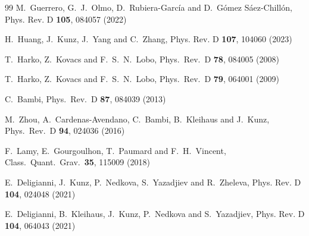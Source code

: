 \documentclass[11pt,a4paper]{article}
\begin{document}
\begin{thebibliography}{99}
M.~Guerrero, G.~J.~Olmo, D.~Rubiera-Garc\'ia and D.~G\'omez S\'aez-Chill\'on,
Phys. Rev. D \textbf{105}, 084057 (2022)


H.~Huang, J.~Kunz, J.~Yang and C.~Zhang,
Phys. Rev. D \textbf{107}, 104060 (2023)

  T.~Harko, Z.~Kovacs and F.~S.~N.~Lobo,
  Phys.\ Rev.\ D {\bf 78}, 084005 (2008)

  T.~Harko, Z.~Kovacs and F.~S.~N.~Lobo,
  Phys.\ Rev.\ D {\bf 79}, 064001 (2009)

  C.~Bambi,
  Phys.\ Rev.\ D {\bf 87}, 084039 (2013)

  M.~Zhou, A.~Cardenas-Avendano, C.~Bambi, B.~Kleihaus and J.~Kunz,
  Phys.\ Rev.\ D {\bf 94}, 024036 (2016)

  F.~Lamy, E.~Gourgoulhon, T.~Paumard and F.~H.~Vincent,
  Class.\ Quant.\ Grav.\  {\bf 35},   115009 (2018)

E.~Deligianni, J.~Kunz, P.~Nedkova, S.~Yazadjiev and R.~Zheleva,
Phys. Rev. D \textbf{104},  024048 (2021)

E.~Deligianni, B.~Kleihaus, J.~Kunz, P.~Nedkova and S.~Yazadjiev,
Phys. Rev. D \textbf{104},  064043 (2021)


\end{thebibliography}
\end{document}
